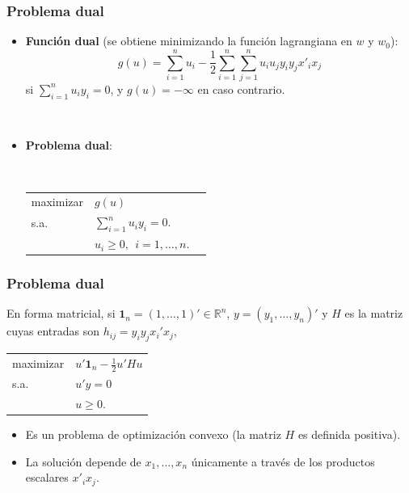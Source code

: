 \documentclass[dvipsnames, pdflatex,slidecentered]{beamer}
\begin{document}
\begin{frame}[plain]
\frametitle{Problema dual}

\begin{itemize}

\item \textbf{Función dual} (se obtiene minimizando la función lagrangiana en $w$ y $w_0$):
\[
g(u) =  \sum_{i=1}^n u_i - \frac{1}{2} \sum_{i=1}^n \sum_{j=1}^n 
u_i u_j y_i y_j x'_i x_j 
\]
si $\sum_{i=1}^n  u_i y_i = 0$, y $g(u)=-\infty$ en caso contrario.

\

\item \textbf{Problema dual}:

\

\begin{center}
\begin{tabular}{lll}
maximizar & $g(u)$ \\
s.a. & $\sum_{i=1}^n  u_i y_i = 0$.  & \\
& $u_i\geq 0,\ \ i=1,\ldots,n$.
\end{tabular}
\end{center}



\end{itemize}

\end{frame}
\begin{frame}[plain]
\frametitle{Problema dual}

En forma matricial, si  $\mathbf{1}_n=(1,\ldots,1)'\in\mathbb{R}^n$, $y=(y_1,\ldots,y_n)'$ y $H$ es la matriz cuyas entradas son $h_{ij}=y_iy_jx_i'x_j$, 


\begin{center}
\begin{tabular}{ll}
maximizar & $u'\mathbf{1}_n - \frac{1}{2}u'Hu$ \\
s.a.     &  $u'y=0$ \\
     & $u\geq 0$.    
\end{tabular}
\end{center}


\begin{itemize}

\item Es un problema de optimización convexo (la matriz $H$ es definida positiva).

\item La solución depende de $x_1,\ldots,x_n$ únicamente a  través de los productos escalares $x'_ix_j$.

\end{itemize}


\end{frame}
\end{document}
